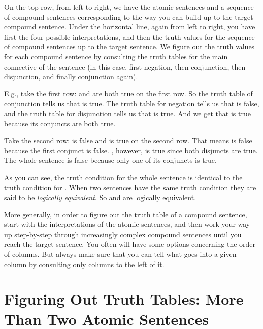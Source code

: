 \begin{center}


\end{center}

On the top row, from left to right, we have the atomic sentences and a sequence 
of compound sentences corresponding to the way you can build up to the target 
compound sentence. Under the horizontal line, again from left to right, you have 
first the four possible interpretations, and then the truth values for the 
sequence of compound sentences up to the target sentence. We figure out the 
truth values for each compound sentence by consulting the truth tables for the 
main connective of the sentence (in this case, first negation, then conjunction, 
then disjunction, and finally conjunction again). 

E.g., take the first row:
 and  are both true on the first row. So the truth table of 
conjunction tells us that  is true. The truth table for negation 
tells us that  is false, and the truth table for disjunction tells us 
that  is true.  And  we get that  is true because its conjuncts are both true.

Take the second row:
 is false and  is true on the second row. That means   is 
false because the first conjunct is false.  , however, is true 
since both disjuncts are true.  The whole sentence  is false because only one of its conjuncts is true.


As you can see, the truth condition for the whole sentence is identical to the 
truth condition for . When two sentences have the same truth 
condition they are said to be \emph{logically equivalent}. So  and 
 are logically equivalent.

More generally, in order to figure out the truth table of a compound sentence, 
start with the interpretations of the atomic sentences, and then work your way 
up step-by-step through increasingly complex compound sentences until you reach  
the target sentence. You often will have some options concerning the order of 
columns. But always make sure that you can tell what goes into a given column by 
consulting only columns to the left of it.


\section{Figuring Out Truth Tables: More Than Two Atomic Sentences}

